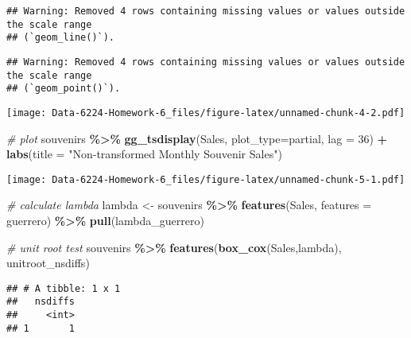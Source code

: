 \documentclass[
]{article}
\newenvironment{Shaded}{\begin{snugshade}}{\end{snugshade}}
\newcommand{\AttributeTok}[1]{\textcolor[rgb]{0.13,0.29,0.53}{#1}}
\newcommand{\CommentTok}[1]{\textcolor[rgb]{0.56,0.35,0.01}{\textit{#1}}}
\newcommand{\DecValTok}[1]{\textcolor[rgb]{0.00,0.00,0.81}{#1}}
\newcommand{\FunctionTok}[1]{\textcolor[rgb]{0.13,0.29,0.53}{\textbf{#1}}}
\newcommand{\NormalTok}[1]{#1}
\newcommand{\OtherTok}[1]{\textcolor[rgb]{0.56,0.35,0.01}{#1}}
\newcommand{\SpecialCharTok}[1]{\textcolor[rgb]{0.81,0.36,0.00}{\textbf{#1}}}
\newcommand{\StringTok}[1]{\textcolor[rgb]{0.31,0.60,0.02}{#1}}
\begin{document}
\begin{verbatim}
## Warning: Removed 4 rows containing missing values or values outside the scale range
## (`geom_line()`).
\end{verbatim}

\begin{verbatim}
## Warning: Removed 4 rows containing missing values or values outside the scale range
## (`geom_point()`).
\end{verbatim}

\texttt{[image: Data-6224-Homework-6\_files/figure-latex/unnamed-chunk-4-2.pdf]}

\begin{Shaded}
\begin{Highlighting}[]
\CommentTok{\# plot}
\NormalTok{souvenirs }\SpecialCharTok{\%\textgreater{}\%}
  \FunctionTok{gg\_tsdisplay}\NormalTok{(Sales, }\AttributeTok{plot\_type=}\StringTok{\textquotesingle{}partial\textquotesingle{}}\NormalTok{, }\AttributeTok{lag =} \DecValTok{36}\NormalTok{) }\SpecialCharTok{+}
  \FunctionTok{labs}\NormalTok{(}\AttributeTok{title =} \StringTok{"Non{-}transformed Monthly Souvenir Sales"}\NormalTok{)}
\end{Highlighting}
\end{Shaded}

\texttt{[image: Data-6224-Homework-6\_files/figure-latex/unnamed-chunk-5-1.pdf]}

\begin{Shaded}
\begin{Highlighting}[]
\CommentTok{\# calculate lambda}
\NormalTok{lambda }\OtherTok{\textless{}{-}}\NormalTok{ souvenirs }\SpecialCharTok{\%\textgreater{}\%}
  \FunctionTok{features}\NormalTok{(Sales, }\AttributeTok{features =}\NormalTok{ guerrero) }\SpecialCharTok{\%\textgreater{}\%}
  \FunctionTok{pull}\NormalTok{(lambda\_guerrero)}

\CommentTok{\# unit root test}
\NormalTok{souvenirs }\SpecialCharTok{\%\textgreater{}\%}
  \FunctionTok{features}\NormalTok{(}\FunctionTok{box\_cox}\NormalTok{(Sales,lambda), unitroot\_nsdiffs)}
\end{Highlighting}
\end{Shaded}

\begin{verbatim}
## # A tibble: 1 x 1
##   nsdiffs
##     <int>
## 1       1
\end{verbatim}
\end{document}
